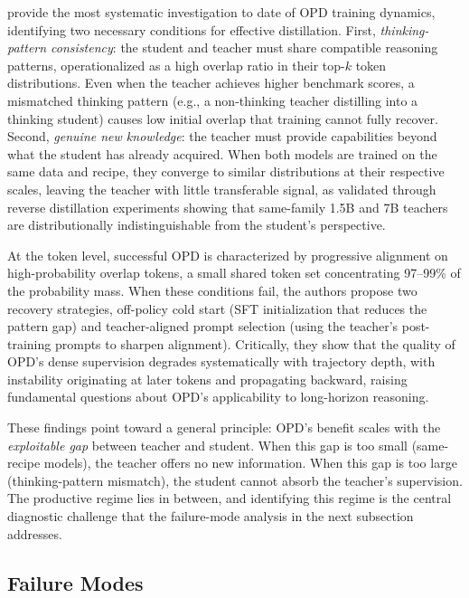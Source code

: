\documentclass{article} %
\begin{document}
\citet{li2026rethinking} provide the most systematic investigation to date of OPD training dynamics, identifying two necessary conditions for effective distillation. First, \emph{thinking-pattern consistency}: the student and teacher must share compatible reasoning patterns, operationalized as a high overlap ratio in their top-$k$ token distributions. Even when the teacher achieves higher benchmark scores, a mismatched thinking pattern (e.g., a non-thinking teacher distilling into a thinking student) causes low initial overlap that training cannot fully recover. Second, \emph{genuine new knowledge}: the teacher must provide capabilities beyond what the student has already acquired. When both models are trained on the same data and recipe, they converge to similar distributions at their respective scales, leaving the teacher with little transferable signal, as validated through reverse distillation experiments showing that same-family 1.5B and 7B teachers are distributionally indistinguishable from the student's perspective.

At the token level, successful OPD is characterized by progressive alignment on high-probability overlap tokens, a small shared token set concentrating 97--99\% of the probability mass. When these conditions fail, the authors propose two recovery strategies, off-policy cold start (SFT initialization that reduces the pattern gap) and teacher-aligned prompt selection (using the teacher's post-training prompts to sharpen alignment). Critically, they show that the quality of OPD's dense supervision degrades systematically with trajectory depth, with instability originating at later tokens and propagating backward, raising fundamental questions about OPD's applicability to long-horizon reasoning.

These findings point toward a general principle: OPD's benefit scales with the \emph{exploitable gap} between teacher and student. When this gap is too small (same-recipe models), the teacher offers no new information. When this gap is too large (thinking-pattern mismatch), the student cannot absorb the teacher's supervision. The productive regime lies in between, and identifying this regime is the central diagnostic challenge that the failure-mode analysis in the next subsection addresses.

\subsection{Failure Modes}
\label{subsec:failure}
\end{document}
